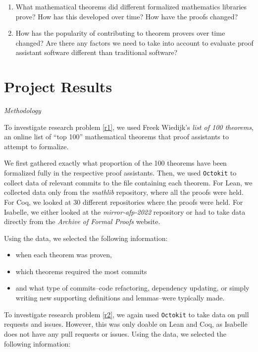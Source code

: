 \documentclass[sigconf,nonacm]{acmart}
\begin{document}
\begin{enumerate}
    \item\label{r1} What mathematical theorems did different formalized mathematics libraries prove? How has this developed over time? How have the proofs changed?
    \item\label{r2} How has the popularity of contributing to theorem provers over time changed? Are there any factors we need to take into account to evaluate proof assistant software different than traditional software?
\end{enumerate}


\section{Project Results}

\textit{Methodology}

To investigate research problem \ref{r1}, we used Freek Wiedijk's \textit{list of 100 theorems}, an online list of ``top 100'' mathematical theorems that proof assistants to attempt to formalize. 

We first gathered exactly what proportion of the 100 theorems have been formalized fully in the respective proof assistants. Then, we used \texttt{Octokit} to collect data of relevant commits to the file containing each theorem. For Lean, we collected data only from the \textit{mathlib} repository, where all the proofs were held. For Coq, we looked at 30 different repositories where the proofs were held. For Isabelle, we either looked at the \textit{mirror-afp-2022} repository or had to take data directly from the \textit{Archive of Formal Proofs} website.

Using the data, we selected the following information:
\begin{itemize}
  \item when each theorem was proven,
  \item which theorems required the most commits
  \item and what type of commits--code refactoring, dependency updating, or simply writing new supporting definitions and lemmas--were typically made.
\end{itemize}

To investigate research problem \ref{r2}, we again used \texttt{Octokit} to take data on pull requests and issues. However, this was only doable on Lean and Coq, as Isabelle does not have any pull requests or issues. Using the data, we selected the following information:
\end{document}
